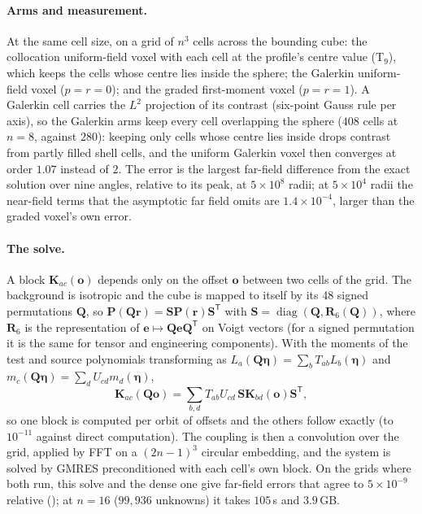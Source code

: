\documentclass[11pt,a4paper]{article}
\newcommand{\bK}{\mathbf{K}}
\newcommand{\bP}{\mathbf{P}}
\begin{document}
\paragraph{Arms and measurement.} At the same cell size, on a grid of $n^3$ cells across the bounding
cube: the collocation uniform-field voxel with each cell at the profile's centre value (T$_9$), which keeps
the cells whose centre lies inside the sphere; the Galerkin uniform-field voxel ($p=r=0$); and the graded
first-moment voxel ($p=r=1$). A Galerkin cell carries the $L^2$ projection of its contrast (six-point Gauss
rule per axis), so the Galerkin arms keep every cell overlapping the sphere ($408$ cells at $n=8$, against
$280$): keeping only cells whose centre lies inside drops contrast from partly filled shell cells, and the
uniform Galerkin voxel then converges at order $1.07$ instead of $2$. The error is the largest far-field difference from the exact
solution over nine angles, relative to its peak, at $5\times10^{8}$ radii; at $5\times10^{4}$ radii the
near-field terms that the asymptotic far field omits are $1.4\times10^{-4}$, larger than the graded
voxel's own error.

\paragraph{The solve.} A block $\bK_{ac}(\mathbf{o})$ depends only on the offset $\mathbf{o}$ between two
cells of the grid. The background is isotropic and the cube is mapped to itself by its 48 signed
permutations $\mathbf{Q}$, so $\bP(\mathbf{Q}\mathbf{r})=\mathbf{S}\bP(\mathbf{r})\mathbf{S}^{\mathsf T}$ with
$\mathbf{S}=\operatorname{diag}(\mathbf{Q},\mathbf{R}_6(\mathbf{Q}))$, where $\mathbf{R}_6$ is the
representation of $\mathbf{e}\mapsto\mathbf{Q}\mathbf{e}\mathbf{Q}^{\mathsf T}$ on Voigt vectors (for a
signed permutation it is the same for tensor and engineering components). With the moments of the test
and source polynomials transforming as $L_a(\mathbf{Q}\boldsymbol\eta)=\sum_bT_{ab}L_b(\boldsymbol\eta)$ and
$m_c(\mathbf{Q}\boldsymbol\eta)=\sum_dU_{cd}m_d(\boldsymbol\eta)$,
\begin{equation}
\bK_{ac}(\mathbf{Q}\mathbf{o})=\sum_{b,d}T_{ab}U_{cd}\,\mathbf{S}\bK_{bd}(\mathbf{o})\mathbf{S}^{\mathsf T},
\end{equation}
so one block is computed per orbit of offsets and the others follow exactly (to $10^{-11}$ against direct
computation). The coupling is then a convolution over the grid, applied by FFT on a $(2n-1)^3$ circular
embedding, and the system is solved by GMRES preconditioned with each cell's own block. On the grids where
both run, this solve and the dense one give far-field errors that agree to $5\times10^{-9}$ relative
(); at $n=16$ ($99{,}936$ unknowns) it takes $105$\,s and
$3.9$\,GB.
\end{document}
